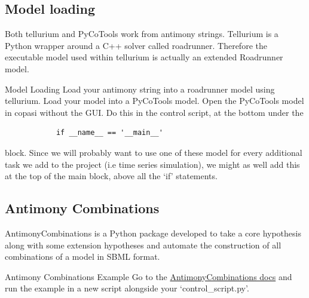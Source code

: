\documentclass[../../main]{subfiles}
\begin{document}
    \subsection{Model loading}
    Both tellurium and PyCoTools work from antimony strings. Tellurium is a Python wrapper around
    a C++ solver called roadrunner. Therefore the executable model used within tellurium is actually
    an extended Roadrunner model.


    \begin{Task}[label=ModelLoading]{Model Loading}
        Load your antimony string into a roadrunner model using tellurium. Load your model into
        a PyCoTools model. Open the PyCoTools model in copasi without the GUI. Do this in the control script,
        at the bottom under the
        \begin{verbatim}
            if __name__ == '__main__'
        \end{verbatim} block.
        Since we will probably want to use one of these model for every additional task we add to the project (i.e
        time series simulation), we might as well add this at the top of the main block, above all the `if' statements.
    \end{Task}

    \subsection{Antimony Combinations}
    AntimonyCombinations is a Python package developed to take a core hypothesis along with some extension
    hypotheses and automate the construction of all combinations of a model in SBML format.

    \begin{Task}[label=AntimonyCombinations]{Antimony Combinations Example}
        Go to the \href{https://antimonycombinations.readthedocs.io/en/latest/}{AntimonyCombinations docs} and run the
        example in a new script alongside your `control\_script.py'.
    \end{Task}

\end{document}
